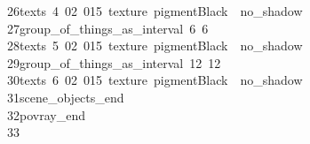 \begin{tabbing}
26\>\>\>\>texts\ 4\ 02\ 015\ texture\ pigmentBlack\ \ no\_shadow\ \\[0pt]
27\>\>\>\>group\_of\_things\_as\_interval\ 6\ 6\ \\[0pt]
28\>\>\>\>texts\ 5\ 02\ 015\ texture\ pigmentBlack\ \ no\_shadow\ \\[0pt]
29\>\>\>\>group\_of\_things\_as\_interval\ 12\ 12\ \\[0pt]
30\>\>\>\>texts\ 6\ 02\ 015\ texture\ pigmentBlack\ \ no\_shadow\ \\[0pt]
31\>\>\>scene\_objects\_end\ \\[0pt]
32\>\>\>povray\_end\\[0pt]
33\>\end{tabbing}
